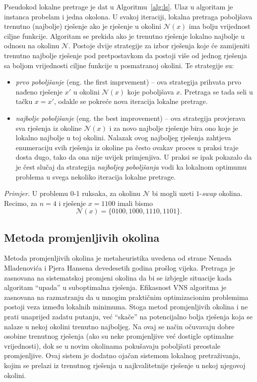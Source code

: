\documentclass[a4paper, utf8, 11pt, colorlinks]{book}
\begin{document}
Pseudokod lokalne pretrage je dat u Algoritmu~\ref{alg:ls}. Ulaz u algoritam je instanca probelam i jedna okolona. U svakoj iteraciji, lokalna pretraga poboljšava trenutno (najbolje) rješenje ako je rješenje u okolini  $\mathcal{N}(x)$ ima bolju vrijednost ciljne funkcije. Algoritam se prekida ako je trenutno rješenje lokalno najbolje u odnosu na okolinu   $\mathcal{N}$.
 Postoje dvije strategije za izbor rješenja koje će zamijeniti trenutno najbolje rješenje pod pretpostavkom da postoji više od jednog rješenja sa boljom vrijednosti ciljne funkcije u posmatranoj okolini. Te strategije su:
 \begin{itemize}
 	\item \emph{prvo poboljšanje} (eng. the first imprvement) -- ova strategija prihvata prvo nađeno rješenje $x'$ u okolini $\mathcal{N}(x)$ koje poboljšava $x$. Pretraga se tada seli u tačku  $x = x'$, odakle se pokreće nova iteracija lokalne pretrage.
 	\item \emph{najbolje poboljšanje} (eng. the best improvement) --   ova strategija provjerava sva rješenja iz okoline $\mathcal{N}(x)$ i za novo najbolje rješenje bira ono koje je lokalno najbolje u toj okolini. Nalazak ovog  najboljeg rješenja zahtjeva enumeraciju svih rješenja iz okoline pa često ovakav proces u praksi traje dosta dugo,  tako da ona nije uvijek primjenjiva. U praksi se ipak pokazalo da  je čest slučaj da strategija \emph{najboljeg poboljšanja} vodi ka lokalnom optimumu problema u svega nekoliko iteracija lokalne pretrage. 
 \end{itemize}
  
  \emph{Primjer.} U   problemu 0-1 ruksaka, za okolinu $\mathcal{N}$ bi mogli uzeti $1$-\emph{swap} okolina. Recimo, za $n=4$ i rješenje $x=1100$ imali  bismo $$\mathcal{N}(x)= \{ 0100, 1000, 1110, 1101 \}.$$ 
  
\subsection{Metoda promjenljivih okolina}\label{intro:vns}
Metoda promjenljivih okolina je metaheuristika uvedena od strane Nenada Mladenovića i Pjera Hansena devedesetih godina prošlog vijeka.
Pretraga je zasnovana na sistematskoj promjeni okolina da bi se izbjegle situacije kada algoritam ``upada'' u suboptimalna rješenja. Efikasnost VNS algoritma je zasnovana na razmatranju da u mnogim praktičnim optimizacionim problemima postoji veza između lokalnih minimuma. Stoga metod promjenljivih okolina i ne prati unaprijed zadatu putanju, već ``skače'' na potencijalno bolja rješenja koja se nalaze u nekoj okolini trenutno najboljeg.
Na ovaj se način očuvavaju dobre osobine trenutnog rješenja (ako su neke promjenljive već dostigle optimalne vrijednosti), dok se u novim okolinama pokušavaju poboljšati preostale promjenljive. Ovaj sistem je dodatno ojačan sistemom lokalnog pretraživanja, kojim se prelazi iz trenutnog rješenja u najkvalitetnije rješenje u nekoj njegovoj okolini.
\end{document}
